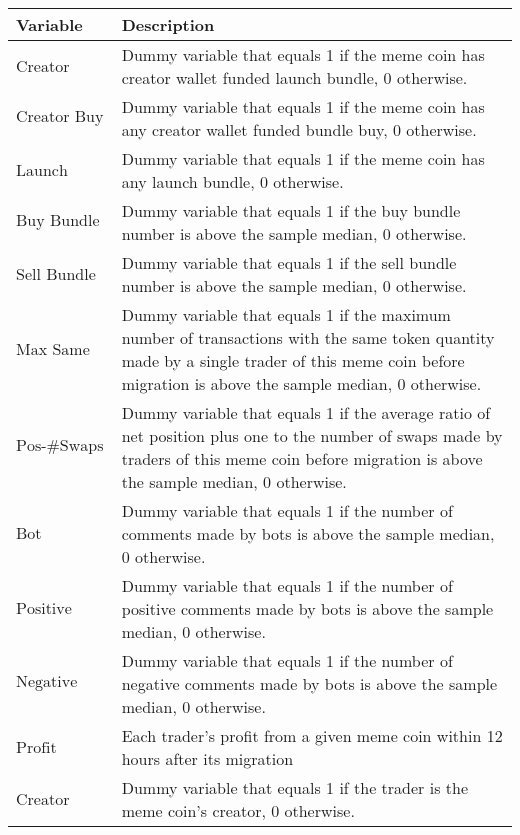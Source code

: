 \begin{tabularx}{\textwidth}{lX}\hline
Variable & Description \\
\hline
$\text{Creator Launch Bundle}$ & Dummy variable that equals 1 if the meme coin has creator wallet funded launch bundle, 0 otherwise. \\
$\text{Creator Buy Bundle}$ & Dummy variable that equals 1 if the meme coin has any creator wallet funded bundle buy, 0 otherwise. \\
$\text{Launch Bundle}$ & Dummy variable that equals 1 if the meme coin has any launch bundle, 0 otherwise. \\
$\text{Buy Bundle}$ & Dummy variable that equals 1 if the buy bundle number is above the sample median, 0 otherwise. \\
$\text{Sell Bundle}$ & Dummy variable that equals 1 if the sell bundle number is above the sample median, 0 otherwise. \\
$\text{Max Same Txn}$ & Dummy variable that equals 1 if the maximum number of transactions with the same token quantity made by a single trader of this meme coin before migration is above the sample median, 0 otherwise. \\
$\text{Pos-\#Swaps Ratio}$ & Dummy variable that equals 1 if the average ratio of net position plus one to the number of swaps made by traders of this meme coin before migration is above the sample median, 0 otherwise. \\
$\text{Bot Comment}$ & Dummy variable that equals 1 if the number of comments made by bots is above the sample median, 0 otherwise. \\
$\text{Positive Comment Bot}$ & Dummy variable that equals 1 if the number of positive comments made by bots is above the sample median, 0 otherwise. \\
$\text{Negative Comment Bot}$ & Dummy variable that equals 1 if the number of negative comments made by bots is above the sample median, 0 otherwise. \\
$\text{Profit}$ & Each trader's profit from a given meme coin within 12 hours after its migration \\
$\text{Creator}$ & Dummy variable that equals 1 if the trader is the meme coin's creator, 0 otherwise. \\
\hline
\end{tabularx}
